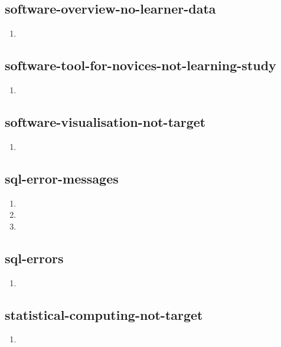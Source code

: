 \documentclass{article}
\begin{document}
\subsection{software-overview-no-learner-data}
\begin{enumerate}
\item {}
\end{enumerate}

\subsection{software-tool-for-novices-not-learning-study}
\begin{enumerate}
\item {}
\end{enumerate}

\subsection{software-visualisation-not-target}
\begin{enumerate}
\item {}
\end{enumerate}

\subsection{sql-error-messages}
\begin{enumerate}
\item {}
\item {}
\item {}
\end{enumerate}

\subsection{sql-errors}
\begin{enumerate}
\item {}
\end{enumerate}

\subsection{statistical-computing-not-target}
\begin{enumerate}
\item {}
\end{enumerate}
\end{document}
